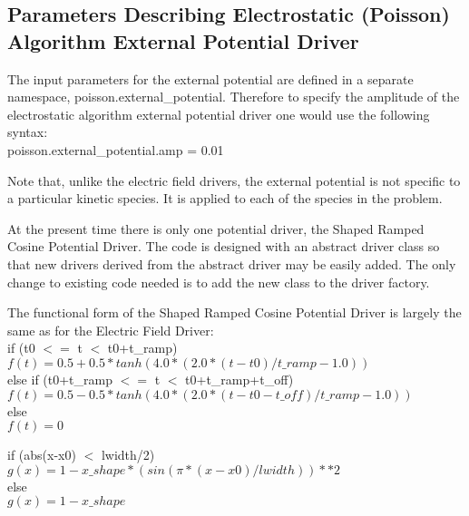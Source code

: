 \documentclass[11pt]{amsart}
\begin{document}
\subsection*{Parameters Describing Electrostatic (Poisson) Algorithm External Potential Driver}
The input parameters for the external potential are defined in a separate
namespace, poisson.external\_potential.  Therefore to specify the amplitude of
the electrostatic algorithm external potential driver one would use the
following syntax: \\
poisson.external\_potential.amp = 0.01

Note that, unlike the electric field drivers, the external potential is not
specific to a particular kinetic species.  It is applied to each of the
species in the problem.

At the present time there is only one potential driver, the Shaped Ramped
Cosine Potential Driver.  The code is designed with an abstract driver class so
that new drivers derived from the abstract driver may be easily added.  The
only change to existing code needed is to add the new class to the driver
factory.

The functional form of the Shaped Ramped Cosine Potential Driver is largely
the same as for the Electric Field Driver: \\
\noindent if (t0 $<=$ t $<$ t0+t\_ramp) \\
\indent \begin{math} f(t) = 0.5+0.5*tanh(4.0*(2.0*(t-t0)/t\_ramp-1.0)) \end{math} \\
else if (t0+t\_ramp $<=$ t $<$ t0+t\_ramp+t\_off) \\
\indent \begin{math} f(t) = 0.5-0.5*tanh(4.0*(2.0*(t-t0-t\_off)/t\_ramp-1.0)) \end{math} \\
else \\
\indent \begin{math} f(t) = 0 \end{math}

\noindent if (abs(x-x0) $<$ lwidth/2) \\
\indent \begin{math} g(x) = 1-x\_shape*(sin(\pi*(x-x0)/lwidth))**2 \end{math} \\
else \\
\indent \begin{math} g(x) = 1-x\_shape \end{math}
\end{document}
